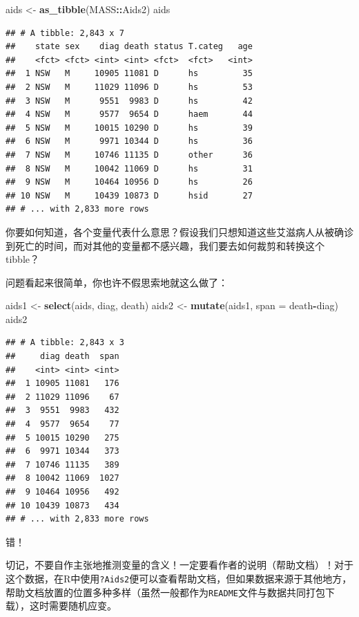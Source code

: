 \documentclass[]{book}
\newenvironment{Shaded}{\begin{snugshade}}{\end{snugshade}}
\newcommand{\DataTypeTok}[1]{\textcolor[rgb]{0.13,0.29,0.53}{#1}}
\newcommand{\KeywordTok}[1]{\textcolor[rgb]{0.13,0.29,0.53}{\textbf{#1}}}
\newcommand{\NormalTok}[1]{#1}
\newcommand{\OperatorTok}[1]{\textcolor[rgb]{0.81,0.36,0.00}{\textbf{#1}}}
\newcommand{\StringTok}[1]{\textcolor[rgb]{0.31,0.60,0.02}{#1}}
\begin{document}
\begin{Shaded}
\begin{Highlighting}[]
\NormalTok{aids <-}\StringTok{ }\KeywordTok{as_tibble}\NormalTok{(MASS}\OperatorTok{::}\NormalTok{Aids2)}
\NormalTok{aids}
\end{Highlighting}
\end{Shaded}

\begin{verbatim}
## # A tibble: 2,843 x 7
##    state sex    diag death status T.categ   age
##    <fct> <fct> <int> <int> <fct>  <fct>   <int>
##  1 NSW   M     10905 11081 D      hs         35
##  2 NSW   M     11029 11096 D      hs         53
##  3 NSW   M      9551  9983 D      hs         42
##  4 NSW   M      9577  9654 D      haem       44
##  5 NSW   M     10015 10290 D      hs         39
##  6 NSW   M      9971 10344 D      hs         36
##  7 NSW   M     10746 11135 D      other      36
##  8 NSW   M     10042 11069 D      hs         31
##  9 NSW   M     10464 10956 D      hs         26
## 10 NSW   M     10439 10873 D      hsid       27
## # ... with 2,833 more rows
\end{verbatim}

你要如何知道，各个变量代表什么意思？假设我们只想知道这些艾滋病人从被确诊到死亡的时间，而对其他的变量都不感兴趣，我们要去如何裁剪和转换这个tibble？

问题看起来很简单，你也许不假思索地就这么做了：

\begin{Shaded}
\begin{Highlighting}[]
\NormalTok{aids1 <-}\StringTok{ }\KeywordTok{select}\NormalTok{(aids, diag, death)}
\NormalTok{aids2 <-}\StringTok{ }\KeywordTok{mutate}\NormalTok{(aids1, }\DataTypeTok{span =}\NormalTok{ death}\OperatorTok{-}\NormalTok{diag)}
\NormalTok{aids2}
\end{Highlighting}
\end{Shaded}

\begin{verbatim}
## # A tibble: 2,843 x 3
##     diag death  span
##    <int> <int> <int>
##  1 10905 11081   176
##  2 11029 11096    67
##  3  9551  9983   432
##  4  9577  9654    77
##  5 10015 10290   275
##  6  9971 10344   373
##  7 10746 11135   389
##  8 10042 11069  1027
##  9 10464 10956   492
## 10 10439 10873   434
## # ... with 2,833 more rows
\end{verbatim}

错！

切记，不要自作主张地推测变量的含义！一定要看作者的说明（帮助文档）！对于这个数据，在R中使用\texttt{?Aids2}便可以查看帮助文档，但如果数据来源于其他地方，帮助文档放置的位置多种多样（虽然一般都作为\texttt{README}文件与数据共同打包下载），这时需要随机应变。
\end{document}

